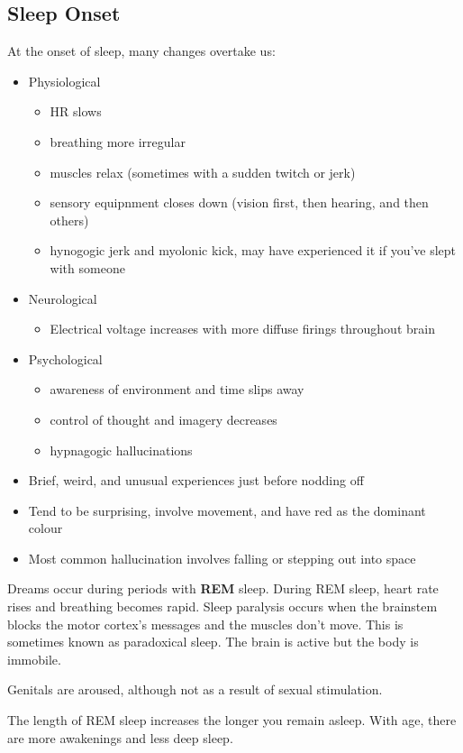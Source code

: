 \documentclass[12pt]{article}
\begin{document}
\subsection*{Sleep Onset}
At the onset of sleep, many changes overtake us:
\begin{itemize}
\item Physiological
  \begin{itemize}
  \item HR slows
  \item breathing more irregular
  \item muscles relax (sometimes with a sudden twitch or jerk)
  \item sensory equipnment closes down (vision first, then hearing, and then others)
  \item hynogogic jerk and myolonic kick, may have experienced it if you've slept with someone
  \end{itemize}
\item Neurological
  \begin{itemize}
  \item Electrical voltage increases with more diffuse firings throughout brain
  \end{itemize}
\item Psychological
  \begin{itemize}
  \item awareness of environment and time slips away
  \item control of thought and imagery decreases
  \item hypnagogic hallucinations
  \end{itemize}
\item Brief, weird, and unusual experiences just before nodding off
\item Tend to be surprising, involve movement, and have red as the dominant colour
\item Most common hallucination involves falling or stepping out into space
\end{itemize}

Dreams occur during periods with \textbf{REM} sleep. During REM sleep, heart rate rises and breathing becomes rapid. Sleep paralysis occurs when the brainstem blocks the motor cortex's messages and the muscles don't move. This is sometimes known as paradoxical sleep. The brain is active but the body is immobile.

Genitals are aroused, although not as a result of sexual stimulation.

The length of REM sleep increases the longer you remain asleep. With age, there are more awakenings and less deep sleep.
\end{document}
